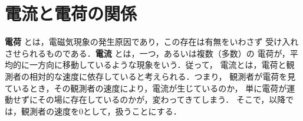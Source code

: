 \section{電流と電荷の関係}
\begin{mycomment}
    \textbf{電荷} とは，電磁気現象の発生原因であり，この存在は有無をいわさず
    受け入れさせられるものである．\textbf{電流} とは，一つ，あるいは複数（多数）の
    電荷が，平均的に一方向に移動しているような現象をいう．従って，
    電流とは，電荷と観測者の相対的な速度に依存していると考えられる．つまり，
    観測者が電荷を見ているとき，その観測者の速度により，電流が生じているのか，
    単に電荷が運動せずにその場に存在しているのかが，変わってきてしまう．
    そこで，以降では，観測者の速度を0として，扱うことにする．
\end{mycomment}
